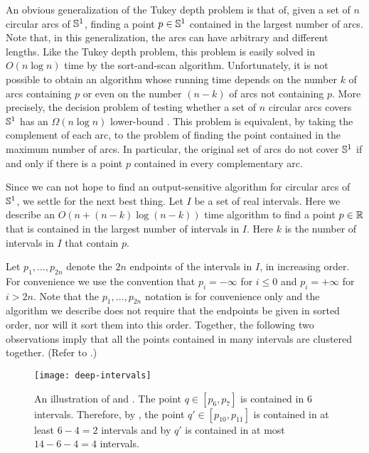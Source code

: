 \documentclass[charterfonts,lotsofwhite]{patmorin}
\begin{document}
An obvious generalization of the Tukey depth problem is that of, given
a set of $n$ circular arcs of $\mathbb{S}^1$, finding a point $p\in\mathbb{S}^1$
contained in the largest number of arcs.  Note that, in this
generalization, the arcs can have arbitrary and different lengths.
Like the Tukey depth problem, this problem is easily solved in
$O(n\log n)$ time by the sort-and-scan algorithm.  Unfortunately, it
is not possible to obtain an algorithm whose running time depends on
the number $k$ of arcs containing $p$ or even on the number $(n-k)$ of
arcs not containing $p$. More precisely, the decision problem of
testing whether a set of $n$ circular arcs covers $\mathbb{S}^1$ has an
$\Omega(n\log n)$ lower-bound \cite{b-o83}.  This problem is
equivalent, by taking the complement of each arc, to the problem of
finding the point contained in the maximum number of arcs.  In
particular, the original set of arcs do not cover $\mathbb{S}^1$ if and only
if there is a point $p$ contained in every complementary arc.

Since we can not hope to find an output-sensitive algorithm for
circular arcs of $\mathbb{S}^1$, we settle for the next best thing.  Let $I$
be a set of real intervals.  Here we describe an $O(n+(n-k)\log
(n-k))$ time algorithm to find a point $p\in\mathbb{R}$ that is contained in
the largest number of intervals in $I$.  Here $k$ is the number of
intervals in $I$ that contain $p$.  

Let $p_1,\ldots,p_{2n}$ denote the $2n$ endpoints of the intervals in
$I$, in increasing order. For convenience we use the convention that
$p_i = -\infty$ for $i\le 0$ and $p_i=+\infty$ for $i > 2n$.  Note
that the $p_1,\ldots,p_{2n}$ notation is for convenience only and the
algorithm we describe does not require that the endpoints be given in
sorted order, nor will it sort them into this order.  Together, the
following two observations imply that all the points contained in many
intervals are clustered together. (Refer to .)

\begin{figure}
\begin{center}
\texttt{[image: deep-intervals]}
\end{center}
\caption{An illustration of  and .  The point $q\in
[p_6,p_7]$ is contained in 6 intervals.  Therefore, by , the point $q'\in
[p_{10},p_{11}]$ is contained in at least $6-4 = 2$ intervals and by
 $q'$ is contained in at most $14-6-4=4$ intervals.}
\end{figure}
\end{document}
